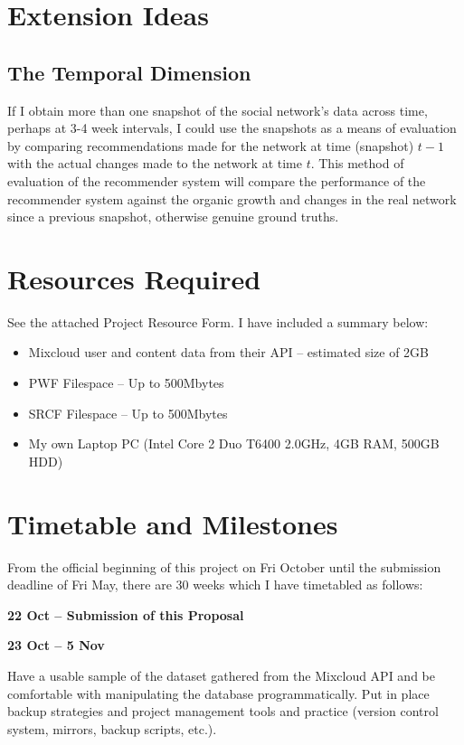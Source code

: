 \section{Extension Ideas}

\subsection*{The Temporal Dimension}
If I obtain more than one snapshot of the social network's data across time, 
perhaps at 3-4 week intervals, I could use the snapshots as a means of 
evaluation by comparing recommendations made for the network at time (snapshot) 
$t-1$ with the actual changes made to the network at time $t$. This method of 
evaluation of the recommender system will compare the performance of the 
recommender system against the organic growth and changes in the real network 
since a previous snapshot, otherwise genuine ground truths.


\section{Resources Required}
See the attached Project Resource Form. I have included a summary below:
\begin{itemize}
\item Mixcloud user and content data from their API -- estimated size of 2GB
\item PWF Filespace -- Up to 500Mbytes
\item SRCF Filespace  -- Up to 500Mbytes
\item My own Laptop PC (Intel Core 2 Duo T6400 2.0GHz, 4GB RAM, 500GB HDD)
\end{itemize}

\section{Timetable and Milestones}

From the official beginning of this project on Fri  October 
until the submission deadline of Fri  May, there are 30 weeks 
which I have timetabled as follows:

\textbf{22 Oct -- Submission of this Proposal}

\textbf{23 Oct -- 5 Nov}

Have a usable sample of the dataset gathered from the Mixcloud API and be 
comfortable with manipulating the database programmatically.
Put in place backup strategies and project management tools and practice 
(version control system, mirrors, backup scripts, etc.).

